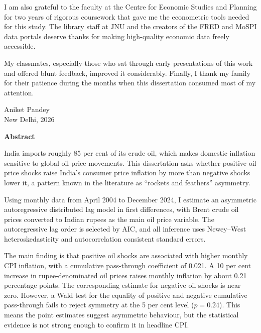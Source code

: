 \documentclass[12pt,a4paper,oneside]{report}
\begin{document}
I am also grateful to the faculty at the Centre for Economic Studies and Planning for two years of rigorous coursework that gave me the econometric tools needed for this study. The library staff at JNU and the creators of the FRED and MoSPI data portals deserve thanks for making high-quality economic data freely accessible.

My classmates, especially those who sat through early presentations of this work and offered blunt feedback, improved it considerably. Finally, I thank my family for their patience during the months when this dissertation consumed most of my attention.

\vspace{1cm}
\begin{flushright}
Aniket Pandey\\
New Delhi, 2026
\end{flushright}

\newpage

\thispagestyle{empty}
\begin{center}
{\LARGE \textbf{Abstract}}
\end{center}
\vspace{1cm}

\noindent India imports roughly 85 per cent of its crude oil, which makes domestic inflation sensitive to global oil price movements. This dissertation asks whether positive oil price shocks raise India's consumer price inflation by more than negative shocks lower it, a pattern known in the literature as ``rockets and feathers'' asymmetry.

Using monthly data from April 2004 to December 2024, I estimate an asymmetric autoregressive distributed lag model in first differences, with Brent crude oil prices converted to Indian rupees as the main oil price variable. The autoregressive lag order is selected by AIC, and all inference uses Newey--West heteroskedasticity and autocorrelation consistent standard errors.

The main finding is that positive oil shocks are associated with higher monthly CPI inflation, with a cumulative pass-through coefficient of 0.021. A 10 per cent increase in rupee-denominated oil prices raises monthly inflation by about 0.21 percentage points. The corresponding estimate for negative oil shocks is near zero. However, a Wald test for the equality of positive and negative cumulative pass-through fails to reject symmetry at the 5 per cent level ($p = 0.24$). This means the point estimates suggest asymmetric behaviour, but the statistical evidence is not strong enough to confirm it in headline CPI.
\end{document}

